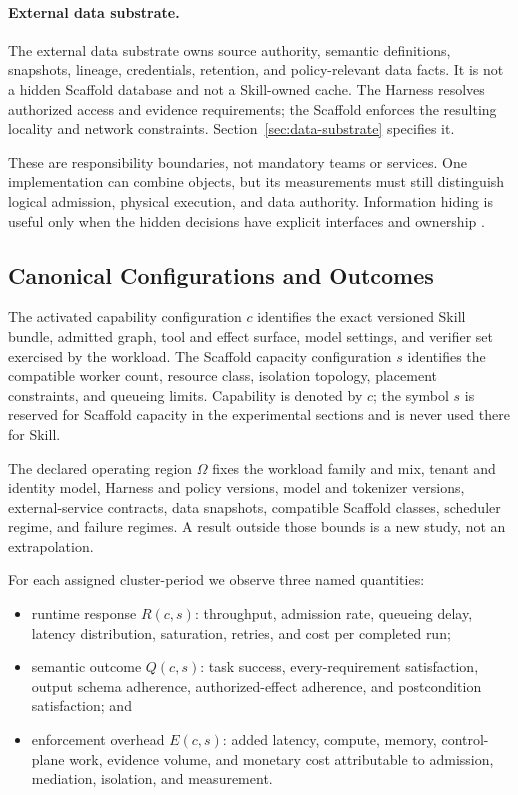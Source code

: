 \paragraph{External data substrate.}
The external data substrate owns source authority, semantic definitions, snapshots, lineage, credentials, retention, and policy-relevant data facts. It is not a hidden Scaffold database and not a Skill-owned cache. The Harness resolves authorized access and evidence requirements; the Scaffold enforces the resulting locality and network constraints. Section~\ref{sec:data-substrate} specifies it.

These are responsibility boundaries, not mandatory teams or services. One implementation can combine objects, but its measurements must still distinguish logical admission, physical execution, and data authority. Information hiding is useful only when the hidden decisions have explicit interfaces and ownership \cite{parnas1972criteria}.

\subsection{Canonical Configurations and Outcomes}

The activated capability configuration $c$ identifies the exact versioned Skill bundle, admitted graph, tool and effect surface, model settings, and verifier set exercised by the workload. The Scaffold capacity configuration $s$ identifies the compatible worker count, resource class, isolation topology, placement constraints, and queueing limits. Capability is denoted by $c$; the symbol $s$ is reserved for Scaffold capacity in the experimental sections and is never used there for Skill.

The declared operating region $\Omega$ fixes the workload family and mix, tenant and identity model, Harness and policy versions, model and tokenizer versions, external-service contracts, data snapshots, compatible Scaffold classes, scheduler regime, and failure regimes. A result outside those bounds is a new study, not an extrapolation.

For each assigned cluster-period we observe three named quantities:

\begin{itemize}
\item runtime response $R(c,s)$: throughput, admission rate, queueing delay, latency distribution, saturation, retries, and cost per completed run;
\item semantic outcome $Q(c,s)$: task success, every-requirement satisfaction, output schema adherence, authorized-effect adherence, and postcondition satisfaction; and
\item enforcement overhead $E(c,s)$: added latency, compute, memory, control-plane work, evidence volume, and monetary cost attributable to admission, mediation, isolation, and measurement.
\end{itemize}


